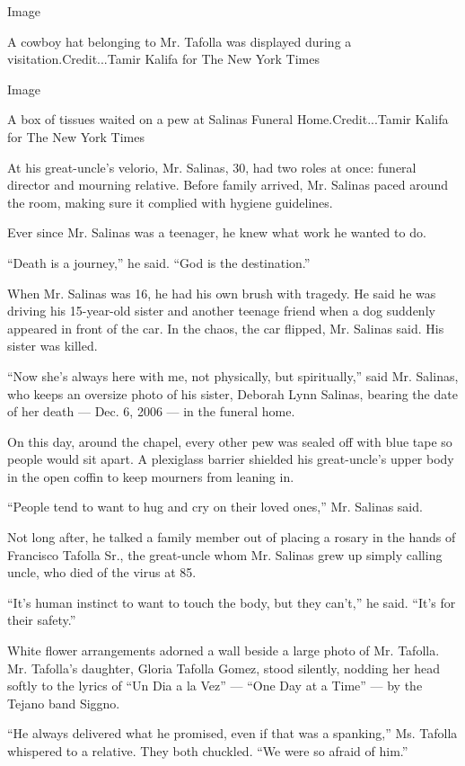 Image

A cowboy hat belonging to Mr. Tafolla was displayed during a
visitation.Credit...Tamir Kalifa for The New York Times

Image

A box of tissues waited on a pew at Salinas Funeral Home.Credit...Tamir
Kalifa for The New York Times

At his great-uncle's velorio, Mr. Salinas, 30, had two roles at once:
funeral director and mourning relative. Before family arrived, Mr.
Salinas paced around the room, making sure it complied with hygiene
guidelines.

Ever since Mr. Salinas was a teenager, he knew what work he wanted to
do.

``Death is a journey,'' he said. ``God is the destination.''

When Mr. Salinas was 16, he had his own brush with tragedy. He said he
was driving his 15-year-old sister and another teenage friend when a dog
suddenly appeared in front of the car. In the chaos, the car flipped,
Mr. Salinas said. His sister was killed.

``Now she's always here with me, not physically, but spiritually,'' said
Mr. Salinas, who keeps an oversize photo of his sister, Deborah Lynn
Salinas, bearing the date of her death --- Dec. 6, 2006 --- in the
funeral home.

On this day, around the chapel, every other pew was sealed off with blue
tape so people would sit apart. A plexiglass barrier shielded his
great-uncle's upper body in the open coffin to keep mourners from
leaning in.

``People tend to want to hug and cry on their loved ones,'' Mr. Salinas
said.

Not long after, he talked a family member out of placing a rosary in the
hands of Francisco Tafolla Sr., the great-uncle whom Mr. Salinas grew up
simply calling uncle, who died of the virus at 85.

``It's human instinct to want to touch the body, but they can't,'' he
said. ``It's for their safety.''

White flower arrangements adorned a wall beside a large photo of Mr.
Tafolla. Mr. Tafolla's daughter, Gloria Tafolla Gomez, stood silently,
nodding her head softly to the lyrics of ``Un Dia a la Vez'' --- ``One
Day at a Time'' --- by the Tejano band Siggno.

``He always delivered what he promised, even if that was a spanking,''
Ms. Tafolla whispered to a relative. They both chuckled. ``We were so
afraid of him.''

